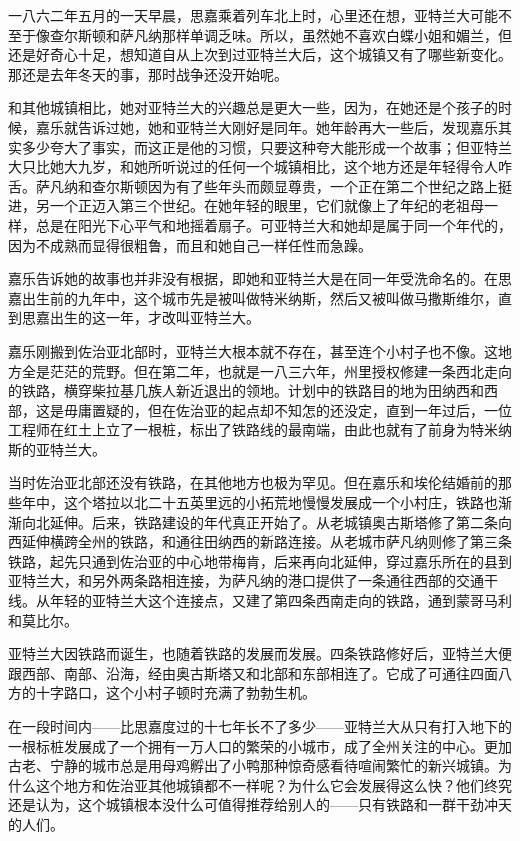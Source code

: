 \par 一八六二年五月的一天早晨，思嘉乘着列车北上时，心里还在想，亚特兰大可能不至于像查尔斯顿和萨凡纳那样单调乏味。所以，虽然她不喜欢白蝶小姐和媚兰，但还是好奇心十足，想知道自从上次到过亚特兰大后，这个城镇又有了哪些新变化。那还是去年冬天的事，那时战争还没开始呢。
\par 和其他城镇相比，她对亚特兰大的兴趣总是更大一些，因为，在她还是个孩子的时候，嘉乐就告诉过她，她和亚特兰大刚好是同年。她年龄再大一些后，发现嘉乐其实多少夸大了事实，而这正是他的习惯，只要这种夸大能形成一个故事；但亚特兰大只比她大九岁，和她所听说过的任何一个城镇相比，这个地方还是年轻得令人咋舌。萨凡纳和查尔斯顿因为有了些年头而颇显尊贵，一个正在第二个世纪之路上挺进，另一个正迈入第三个世纪。在她年轻的眼里，它们就像上了年纪的老祖母一样，总是在阳光下心平气和地摇着扇子。可亚特兰大和她却是属于同一个年代的，因为不成熟而显得很粗鲁，而且和她自己一样任性而急躁。
\par 嘉乐告诉她的故事也并非没有根据，即她和亚特兰大是在同一年受洗命名的。在思嘉出生前的九年中，这个城市先是被叫做特米纳斯，然后又被叫做马撒斯维尔，直到思嘉出生的这一年，才改叫亚特兰大。
\par 嘉乐刚搬到佐治亚北部时，亚特兰大根本就不存在，甚至连个小村子也不像。这地方全是茫茫的荒野。但在第二年，也就是一八三六年，州里授权修建一条西北走向的铁路，横穿柴拉基几族人新近退出的领地。计划中的铁路目的地为田纳西和西部，这是毋庸置疑的，但在佐治亚的起点却不知怎的还没定，直到一年过后，一位工程师在红土上立了一根桩，标出了铁路线的最南端，由此也就有了前身为特米纳斯的亚特兰大。
\par 当时佐治亚北部还没有铁路，在其他地方也极为罕见。但在嘉乐和埃伦结婚前的那些年中，这个塔拉以北二十五英里远的小拓荒地慢慢发展成一个小村庄，铁路也渐渐向北延伸。后来，铁路建设的年代真正开始了。从老城镇奥古斯塔修了第二条向西延伸横跨全州的铁路，和通往田纳西的新路连接。从老城市萨凡纳则修了第三条铁路，起先只通到佐治亚的中心地带梅肯，后来再向北延伸，穿过嘉乐所在的县到亚特兰大，和另外两条路相连接，为萨凡纳的港口提供了一条通往西部的交通干线。从年轻的亚特兰大这个连接点，又建了第四条西南走向的铁路，通到蒙哥马利和莫比尔。
\par 亚特兰大因铁路而诞生，也随着铁路的发展而发展。四条铁路修好后，亚特兰大便跟西部、南部、沿海，经由奥古斯塔又和北部和东部相连了。它成了可通往四面八方的十字路口，这个小村子顿时充满了勃勃生机。
\par 在一段时间内——比思嘉度过的十七年长不了多少——亚特兰大从只有打入地下的一根标桩发展成了一个拥有一万人口的繁荣的小城市，成了全州关注的中心。更加古老、宁静的城市总是用母鸡孵出了小鸭那种惊奇感看待喧闹繁忙的新兴城镇。为什么这个地方和佐治亚其他城镇都不一样呢？为什么它会发展得这么快？他们终究还是认为，这个城镇根本没什么可值得推荐给别人的——只有铁路和一群干劲冲天的人们。
